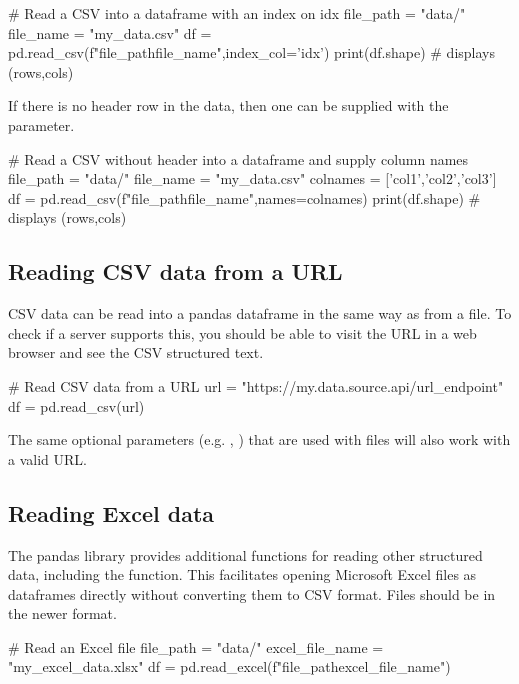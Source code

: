 \begin{pycode}
    # Read a CSV into a dataframe with an index on idx
    file_path = "data/"
    file_name = "my_data.csv"
    df = pd.read_csv(f"{file_path}{file_name}",index_col='idx')
    print(df.shape) # displays (rows,cols)
\end{pycode}

\newpage
If there is no header row in the data, then one can be supplied with the  parameter.

\begin{pycode}
    # Read a CSV without header into a dataframe and supply column names
    file_path = "data/"
    file_name = "my_data.csv"
    colnames = ['col1','col2','col3']
    df = pd.read_csv(f"{file_path}{file_name}",names=colnames)
    print(df.shape) # displays (rows,cols)
\end{pycode}


\subsection{Reading CSV data from a URL}

CSV data can be read into a pandas dataframe in the same way as from a file. To check if a server supports this, you should be able to visit the URL in a web browser and see the CSV structured text.

\begin{pycode}
    # Read CSV data from a URL
    url =  "https://my.data.source.api/url_endpoint"
    df = pd.read_csv(url)
\end{pycode}

The same optional parameters (e.g. , ) that are used with files will also work with a valid URL.

\subsection{Reading Excel data}

The pandas library provides additional functions for reading other structured data, including the  function. This facilitates opening Microsoft Excel files as dataframes directly without converting them to CSV format. Files should be in the newer  format.

\begin{pycode}
    # Read an Excel file
    file_path = "data/"
    excel_file_name = "my_excel_data.xlsx"
    df = pd.read_excel(f"{file_path}{excel_file_name}")
\end{pycode}

